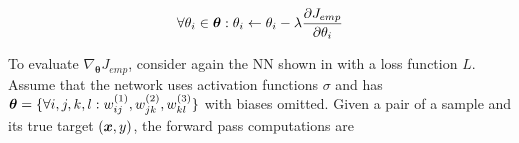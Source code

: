 
%


%


\begin{align}
 \forall \theta_i \in \boldsymbol{\theta} : \theta_i \leftarrow \theta_i - \lambda  \frac{\partial J_{emp} }{\partial \theta_i}
\label{eq:gradient_update}
\end{align}

To evaluate $\nabla_{\boldsymbol{\theta}} J_{emp}$, 
consider again the NN shown in \addfigure{\ref{fig:nn_typical_structure}} with a loss function $L$. Assume that the network uses activation functions $\sigma$ and has $\boldsymbol{\theta} = \{ \forall i,j,k,l : w^{(1)}_{ij}, w^{(2)}_{jk}, w^{(3)}_{kl}  \}$ with biases omitted. Given a pair of a sample and its true target $(\boldsymbol{x}, y)$, the forward pass computations are

